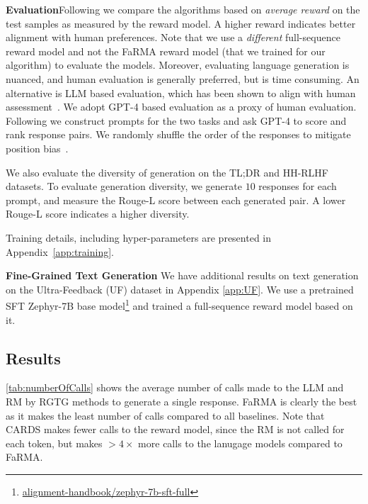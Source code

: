 \textbf{Evaluation}\quad Following \cite{khanov2023alignment} we compare the algorithms based on \emph{average reward} on the test samples as measured by the reward model.
A higher reward indicates better alignment with human preferences.
Note that we use a \emph{different} full-sequence reward model and not the FaRMA reward model (that we trained for our algorithm) to evaluate the models.
Moreover, evaluating language generation is nuanced, and human evaluation is generally preferred, but is time consuming. An alternative is LLM based evaluation, which has been shown to align with human assessment~\cite{zheng2023judging,rafailov2023direct}. We adopt GPT-4 based evaluation as a proxy of human evaluation. Following \cite{chiang2023vicuna} we construct prompts for the two tasks and ask GPT-4 to score and rank response pairs. We randomly shuffle the order of the responses to mitigate position bias~\cite{zheng2023judging}.

We also evaluate the diversity of generation on the TL;DR and HH-RLHF datasets. To evaluate generation diversity, we generate \(10\) responses for each prompt, and measure the Rouge-L score between each generated pair. A lower Rouge-L score indicates a higher diversity.

Training details, including hyper-parameters are presented in Appendix~\ref{app:training}.

\textbf{Fine-Grained Text Generation} We have additional results on text generation on the Ultra-Feedback (UF) dataset \citep{cui2024ultrafeedback} in Appendix \ref{app:UF}.
We use a pretrained SFT Zephyr-7B base model\footnote{\href{https://huggingface.co/alignment-handbook/zephyr-7b-sft-full}{alignment-handbook/zephyr-7b-sft-full}} and trained a full-sequence reward model based on it.

\subsection{Results}
\label{sec:results}

\cref{tab:numberOfCalls} shows the average number of calls made to the LLM and RM by RGTG methods to generate a single response. FaRMA is clearly the best as it makes the least number of calls compared to all baselines. Note that CARDS makes fewer calls to the reward model, since the RM is not called for each token, but makes  $> 4\times$ more calls to the lanugage models compared to FaRMA.   

